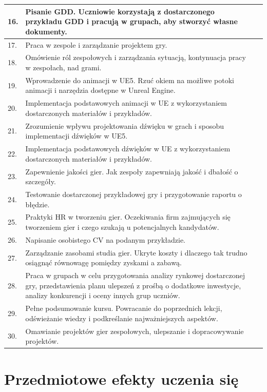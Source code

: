 \documentclass[12pt, a4paper]{article}
\begin{document}
\begin{longtable}{|p{1.5cm}|p{6.5cm}|p{6.5cm}|}
  \hline
  16. & Pisanie GDD. Uczniowie korzystają z dostarczonego przykładu GDD i pracują w grupach, aby stworzyć własne dokumenty. &  \\
  \hline
  17. & Praca w zespole i zarządzanie projektem gry. &  \\
  \hline
  18. & Omówienie ról zespołowych i zarządzania sytuacją, kontynuacja pracy w zespołach, nad grami. &  \\
  \hline
  19. & Wprowadzenie do animacji w UE5. Rzuć okiem na możliwe potoki animacji i narzędzia dostępne w Unreal Engine. &  \\
  \hline
  20. & Implementacja podstawowych animacji w UE z wykorzystaniem dostarczonych materiałów i przykładów. &  \\
  \hline
  21. & Zrozumienie wpływu projektowania dźwięku w grach i sposobu implementacji dźwięków w UE5. &  \\
  \hline
  22. & Implementacja podstawowych dźwięków w UE z wykorzystaniem dostarczonych materiałów i przykładów. &  \\
  \hline
  23. & Zapewnienie jakości gier. Jak zespoły zapewniają jakość i dbałość o szczegóły. &  \\
  \hline
  24. & Testowanie dostarczonej przykładowej gry i przygotowanie raportu o błędzie. &  \\
  \hline
  25. & Praktyki HR w tworzeniu gier. Oczekiwania firm zajmujących się tworzeniem gier i czego szukają u potencjalnych kandydatów. &  \\
  \hline
  26. & Napisanie osobistego CV na podanym przykładzie. &  \\
  \hline
  27. & Zarządzanie zasobami studia gier. Ukryte koszty i dlaczego tak trudno osiągnąć równowagę pomiędzy zyskami a zabawą. &  \\
  \hline
  28. & Praca w grupach w celu przygotowania analizy rynkowej dostarczonej gry, przedstawienia planu ulepszeń z prośbą o dodatkowe inwestycje, analizy konkurencji i oceny innych grup uczniów. &  \\
  \hline
  29. & Pełne podsumowanie kursu. Powracanie do poprzednich lekcji, odświeżanie wiedzy i podkreślanie najważniejszych aspektów. &  \\
  \hline
  30. & Omawianie projektów gier zespołowych, ulepszanie i dopracowywanie projektów. &  \\
  \hline
\end{longtable}

\section{Przedmiotowe efekty uczenia się}
\end{document}
